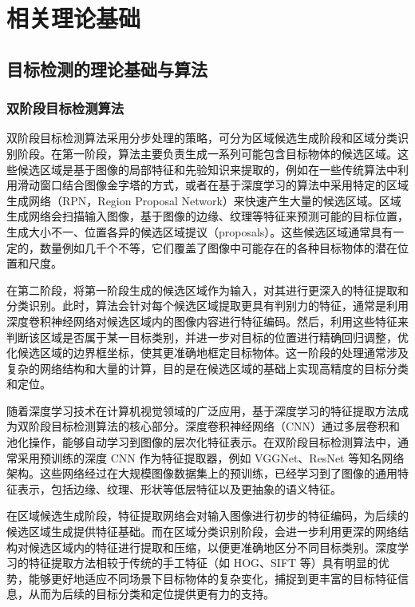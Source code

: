 \section{相关理论基础\label{相关工作}}

\subsection{目标检测的理论基础与算法}

\subsubsection{双阶段目标检测算法}

双阶段目标检测算法采用分步处理的策略，可分为区域候选生成阶段和区域分类识别阶段。在第一阶段，算法主要负责生成一系列可能包含目标物体的候选区域。这些候选区域是基于图像的局部特征和先验知识来提取的，例如在一些传统算法中利用滑动窗口结合图像金字塔的方式，或者在基于深度学习的算法中采用特定的区域生成网络（RPN，Region Proposal Network）来快速产生大量的候选区域。区域生成网络会扫描输入图像，基于图像的边缘、纹理等特征来预测可能的目标位置，生成大小不一、位置各异的候选区域提议（proposals）。这些候选区域通常具有一定的，数量例如几千个不等，它们覆盖了图像中可能存在的各种目标物体的潜在位置和尺度。

在第二阶段，将第一阶段生成的候选区域作为输入，对其进行更深入的特征提取和分类识别。此时，算法会针对每个候选区域提取更具有判别力的特征，通常是利用深度卷积神经网络对候选区域内的图像内容进行特征编码。然后，利用这些特征来判断该区域是否属于某一目标类别，并进一步对目标的位置进行精确回归调整，优化候选区域的边界框坐标，使其更准确地框定目标物体。这一阶段的处理通常涉及复杂的网络结构和大量的计算，目的是在候选区域的基础上实现高精度的目标分类和定位。

随着深度学习技术在计算机视觉领域的广泛应用，基于深度学习的特征提取方法成为双阶段目标检测算法的核心部分。深度卷积神经网络（CNN）\cite{cnn}通过多层卷积和池化操作，能够自动学习到图像的层次化特征表示。在双阶段目标检测算法中，通常采用预训练的深度 CNN 作为特征提取器，例如 VGGNet\cite{simonyan2014very}、ResNet \cite{he2016deep}等知名网络架构。这些网络经过在大规模图像数据集上的预训练，已经学习到了图像的通用特征表示，包括边缘、纹理、形状等低层特征以及更抽象的语义特征。

在区域候选生成阶段，特征提取网络会对输入图像进行初步的特征编码，为后续的候选区域生成提供特征基础。而在区域分类识别阶段，会进一步利用更深的网络结构对候选区域内的特征进行提取和压缩，以便更准确地区分不同目标类别。深度学习的特征提取方法相较于传统的手工特征（如 HOG、SIFT 等）\cite{Haar_like}具有明显的优势，能够更好地适应不同场景下目标物体的复杂变化，捕捉到更丰富的目标特征信息，从而为后续的目标分类和定位提供更有力的支持。

